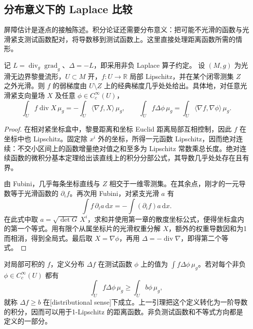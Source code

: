 \subsection{分布意义下的 Laplace 比较}
\label{g3:subsec:0704:03}

屏障估计是逐点的接触陈述。积分论证还需要分布意义：把可能不光滑的函数与光滑紧支测试函数配对，将导数移到测试函数上。这里直接处理距离函数所需的情形。

\begin{lemma}\label{g3:lem:lipschitz-weak-gradient}
	记 \(L=\operatorname{div}_g\operatorname{grad}_g\)、\(\Delta=-L\)，即采用非负 Laplace 算子约定。
	设 \((M,g)\) 为光滑无边界黎曼流形，\(U\subset M\) 开，\(f:U\to\mathbb R\) 局部 Lipschitz，并在某个闭零测集 \(Z\) 之外光滑。则 \(f\) 的弱梯度由 \(U\setminus Z\) 上的经典梯度几乎处处给出。具体地，对任意光滑紧支向量场 \(X\) 及任意 \(\phi\in C_c^\infty(U)\)，
	\[
		\int_U f\operatorname{div}X\,\mu_g
		=-\int_U\langle\nabla f,X\rangle\,\mu_g,
		\qquad
		\int_U f\Delta\phi\,\mu_g
		=\int_U\langle\nabla f,\nabla\phi\rangle\,\mu_g.
	\]
\end{lemma}
\begin{proof}
	在相对紧坐标盒中，黎曼距离和坐标 Euclid 距离局部互相控制，因此 \(f\) 在坐标中也 Lipschitz。固定除 \(x^i\) 外的坐标，所得一元函数 Lipschitz，因而绝对连续：不交小区间上的函数增量绝对值之和至多为 Lipschitz 常数乘总长度。绝对连续函数的微积分基本定理给出该直线上的积分分部公式，其导数几乎处处存在且有界。

	由 Fubini，几乎每条坐标直线与 \(Z\) 相交于一维零测集。在其余点，刚才的一元导数等于光滑函数的 \(\partial_i f\)。再次用 Fubini，对紧支光滑 \(a\) 有
	\[
		\int f\,\partial_i a\,\mathrm{d}x
		=-\int (\partial_i f)a\,\mathrm{d}x.
	\]
	在此式中取 \(a=\sqrt{\det G}\,X^i\)，求和并使用第一章的散度坐标公式，便得坐标盒内的第一个等式。用有限个从属坐标片的光滑权重分解 \(X\)，额外的权重导数因和为1而相消，得到全局式。最后取 \(X=\nabla\phi\)，再用 \(\Delta=-\operatorname{div}\nabla\)，即得第二个等式。
\end{proof}

对局部可积的 \(f\)，定义分布 \(\Delta f\) 在测试函数 \(\phi\) 上的值为 \(\int f\Delta\phi\,\mu_g\)。若对每个非负 \(\phi\in C_c^\infty(U)\) 都有
\[
	\int_U f\Delta\phi\,\mu_g\ge\int_U b\phi\,\mu_g,
\]
就称 \(\Delta f\ge b\) 在[distributional sense]下成立。上一引理把这个定义转化为一阶导数的积分，因而可以用于1-Lipschitz 的距离函数。非负测试函数和不等式方向都是定义的一部分。


